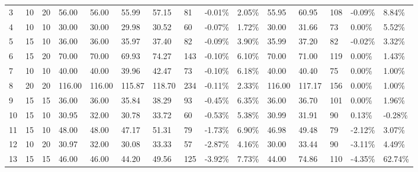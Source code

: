 \begin{longtable}{l|ll|ll|lllll|lllll}
  3  & 10                         & 20                         & 56.00                     & 56.00       & 55.99         & 57.15  & 81  & -0.01\% & 2.05\% & 55.95  & 60.95  & 108 & -0.09\% & 8.84\%  \\
  4  & 10                         & 10                         & 30.00                     & 30.00       & 29.98         & 30.52  & 60  & -0.07\% & 1.72\% & 30.00  & 31.66  & 73  & 0.00\%  & 5.52\%  \\
  5  & 15                         & 10                         & 36.00                     & 36.00       & 35.97         & 37.40  & 82  & -0.09\% & 3.90\% & 35.99  & 37.20  & 82  & -0.02\% & 3.32\%  \\
  6  & 15                         & 20                         & 70.00                     & 70.00       & 69.93         & 74.27  & 143 & -0.10\% & 6.10\% & 70.00  & 71.00  & 119 & 0.00\%  & 1.43\%  \\
  7  & 10                         & 10                         & 40.00                     & 40.00       & 39.96         & 42.47  & 73  & -0.10\% & 6.18\% & 40.00  & 40.40  & 75  & 0.00\%  & 1.00\%  \\
  8  & 20                         & 20                         & 116.00                    & 116.00      & 115.87        & 118.70 & 234 & -0.11\% & 2.33\% & 116.00 & 117.17 & 156 & 0.00\%  & 1.00\%  \\
  9  & 15                         & 15                         & 36.00                     & 36.00       & 35.84         & 38.29  & 93  & -0.45\% & 6.35\% & 36.00  & 36.70  & 101 & 0.00\%  & 1.96\%  \\
  10 & 15                         & 10                         & 30.95                     & 32.00       & 30.78         & 33.72  & 60  & -0.53\% & 5.38\% & 30.99  & 31.91  & 90  & 0.13\%  & -0.28\% \\
  11 & 15                         & 10                         & 48.00                     & 48.00       & 47.17         & 51.31  & 79  & -1.73\% & 6.90\% & 46.98  & 49.48  & 79  & -2.12\% & 3.07\%  \\
  12 & 10                         & 20                         & 30.97                     & 32.00       & 30.08         & 33.33  & 57  & -2.87\% & 4.16\% & 30.00  & 33.44  & 90  & -3.11\% & 4.49\%  \\
  13 & 15                         & 15                         & 46.00                     & 46.00       & 44.20         & 49.56  & 125 & -3.92\% & 7.73\% & 44.00  & 74.86  & 110 & -4.35\% & 62.74\% \\

\end{longtable}
